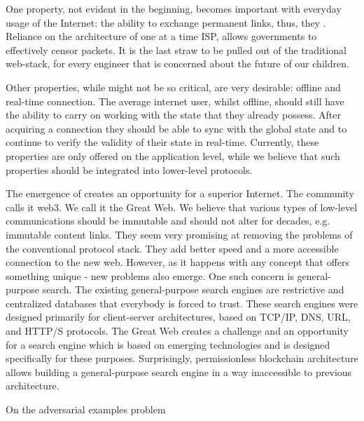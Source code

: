 \documentclass[8pt,oneside]{amsart}
\makeatletter
\newcommand{\linkgreen}[2]{\href{#1}{\color{green}{#2}}}
\renewcommand\subsection{\@startsection{subsection}
                                    {2}{\z@}
                                    {-3.25ex\@plus -1ex \@minus -.2ex}
                                    {0ex \@plus .2ex}
                                    {\play\Large}
                        }
\newcommand{\titleSection}[1]{\subsection{#1}}
\makeatother
\begin{document}
One property, not evident in the beginning, becomes important with everyday usage of the Internet: the ability to exchange permanent links, thus, they \linkgreen{https://ipfs.io/ipfs/QmNhaUrhM7KcWzFYdBeyskoNyihrpHvUEBQnaddwPZigcN}{would not break after time had passed}. Reliance on the architecture of one at a time ISP, allows governments to effectively censor packets. It is the last straw to be pulled out of the traditional web-stack, for every engineer that is concerned about the future of our children.

Other properties, while might not be so critical, are very desirable: offline and real-time connection. The average internet user, whilst offline, should still have the ability to carry on working with the state that they already possess. After acquiring a connection they should be able to sync with the global state and to continue to verify the validity of their state in real-time. Currently, these properties are only offered on the application level, while we believe that such properties should be integrated into lower-level protocols.

The emergence of \linkgreen{https://ipfs.io/ipfs/Qmf3eHU9idMUZgx6MKhCsFPWL24X9pDUi2ECqyH8UtBAMQ}{a brand-new web-stack} creates an opportunity for a superior Internet. The community calls it web3. We call it the Great Web. We believe that various types of low-level communications should be immutable and should not alter for decades, e.g. immutable content links. They seem very promising at removing the problems of the conventional protocol stack. They add better speed and a more accessible connection to the new web. However, as it happens with any concept that offers something unique - new problems also emerge. One such concern is general-purpose search. The existing general-purpose search engines are restrictive and centralized databases that everybody is forced to trust. These search engines were designed primarily for client-server architectures, based on TCP/IP, DNS, URL, and HTTP/S protocols. The Great Web creates a challenge and an opportunity for a search engine which is based on emerging technologies and is designed specifically for these purposes. Surprisingly, permissionless blockchain architecture allows building a general-purpose search engine in a way inaccessible to previous architecture.

\titleSection{On the adversarial examples problem}\label{adversarial-examples}
\end{document}
